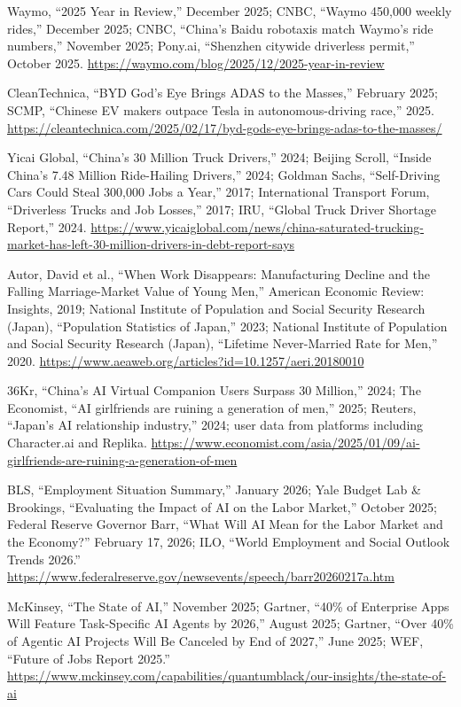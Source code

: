 \documentclass[11pt,a4paper]{article}
\begin{document}
\noindent [85] Waymo, ``2025 Year in Review,'' December 2025; CNBC, ``Waymo 450,000 weekly rides,'' December 2025; CNBC, ``China's Baidu robotaxis match Waymo's ride numbers,'' November 2025; Pony.ai, ``Shenzhen citywide driverless permit,'' October 2025. \url{https://waymo.com/blog/2025/12/2025-year-in-review}

\noindent [86] CleanTechnica, ``BYD God's Eye Brings ADAS to the Masses,'' February 2025; SCMP, ``Chinese EV makers outpace Tesla in autonomous-driving race,'' 2025. \url{https://cleantechnica.com/2025/02/17/byd-gods-eye-brings-adas-to-the-masses/}

\noindent [87] Yicai Global, ``China's 30 Million Truck Drivers,'' 2024; Beijing Scroll, ``Inside China's 7.48 Million Ride-Hailing Drivers,'' 2024; Goldman Sachs, ``Self-Driving Cars Could Steal 300,000 Jobs a Year,'' 2017; International Transport Forum, ``Driverless Trucks and Job Losses,'' 2017; IRU, ``Global Truck Driver Shortage Report,'' 2024. \url{https://www.yicaiglobal.com/news/china-saturated-trucking-market-has-left-30-million-drivers-in-debt-report-says}

\noindent [88] Autor, David et al., ``When Work Disappears: Manufacturing Decline and the Falling Marriage-Market Value of Young Men,'' American Economic Review: Insights, 2019; National Institute of Population and Social Security Research (Japan), ``Population Statistics of Japan,'' 2023; National Institute of Population and Social Security Research (Japan), ``Lifetime Never-Married Rate for Men,'' 2020. \url{https://www.aeaweb.org/articles?id=10.1257/aeri.20180010}

\noindent [89] 36Kr, ``China's AI Virtual Companion Users Surpass 30 Million,'' 2024; The Economist, ``AI girlfriends are ruining a generation of men,'' 2025; Reuters, ``Japan's AI relationship industry,'' 2024; user data from platforms including Character.ai and Replika. \url{https://www.economist.com/asia/2025/01/09/ai-girlfriends-are-ruining-a-generation-of-men}

\noindent [90] BLS, ``Employment Situation Summary,'' January 2026; Yale Budget Lab \& Brookings, ``Evaluating the Impact of AI on the Labor Market,'' October 2025; Federal Reserve Governor Barr, ``What Will AI Mean for the Labor Market and the Economy?'' February 17, 2026; ILO, ``World Employment and Social Outlook Trends 2026.'' \url{https://www.federalreserve.gov/newsevents/speech/barr20260217a.htm}

\noindent [91] McKinsey, ``The State of AI,'' November 2025; Gartner, ``40\% of Enterprise Apps Will Feature Task-Specific AI Agents by 2026,'' August 2025; Gartner, ``Over 40\% of Agentic AI Projects Will Be Canceled by End of 2027,'' June 2025; WEF, ``Future of Jobs Report 2025.'' \url{https://www.mckinsey.com/capabilities/quantumblack/our-insights/the-state-of-ai}
\end{document}
